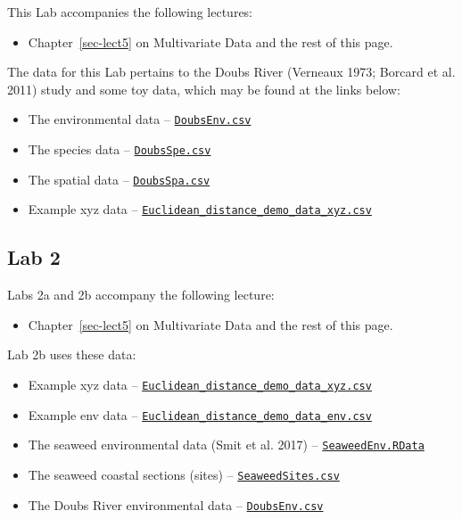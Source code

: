 \documentclass[
  12pt,
]{book}
\providecommand{\tightlist}{%
  \setlength{\itemsep}{0pt}\setlength{\parskip}{0pt}}
\let\oldtexttt\texttt
\renewcommand{\texttt}[1]{\oldtexttt{\small #1}}
\begin{document}
This Lab accompanies the following lectures:

\begin{itemize}
\tightlist
\item
  Chapter~\ref{sec-lect5} on Multivariate Data and the rest of this
  page.
\end{itemize}

The data for this Lab pertains to the Doubs River (Verneaux 1973;
Borcard et al. 2011) study and some toy data, which may be found at the
links below:

\begin{itemize}
\tightlist
\item
  The environmental data --
  \href{../data/DoubsEnv.csv}{\texttt{DoubsEnv.csv}}
\item
  The species data -- \href{../data/DoubsSpe.csv}{\texttt{DoubsSpe.csv}}
\item
  The spatial data -- \href{../data/DoubsSpa.csv}{\texttt{DoubsSpa.csv}}
\item
  Example xyz data --
  \href{../data/Euclidean_distance_demo_data_xyz.csv}{\texttt{Euclidean\_distance\_demo\_data\_xyz.csv}}
\end{itemize}

\subsection{Lab 2}\label{lab-2}

Labs 2a and 2b accompany the following lecture:

\begin{itemize}
\tightlist
\item
  Chapter~\ref{sec-lect5} on Multivariate Data and the rest of this
  page.
\end{itemize}

Lab 2b uses these data:

\begin{itemize}
\tightlist
\item
  Example xyz data --
  \href{../data/Euclidean_distance_demo_data_xyz.csv}{\texttt{Euclidean\_distance\_demo\_data\_xyz.csv}}
\item
  Example env data --
  \href{../data/Euclidean_distance_demo_data_env.csv}{\texttt{Euclidean\_distance\_demo\_data\_env.csv}}
\item
  The seaweed environmental data (Smit et al. 2017) --
  \href{../data/seaweed/SeaweedEnv.RData}{\texttt{SeaweedEnv.RData}}
\item
  The seaweed coastal sections (sites) --
  \href{../data/seaweed/SeaweedSites.csv}{\texttt{SeaweedSites.csv}}
\item
  The Doubs River environmental data --
  \href{../data/DoubsEnv.csv}{\texttt{DoubsEnv.csv}}
\end{itemize}
\end{document}
